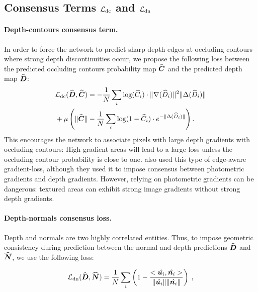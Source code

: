 \documentclass[10pt,twocolumn,letterpaper]{article}
\begin{document}
\subsection{Consensus Terms $\mathcal{L}_{\text{dc}}$ and 
$\mathcal{L}_{\text{dn}}$}\label{ssec:consensus_terms}

\paragraph{Depth-contours consensus term.}
In order to force the network to predict  sharp depth edges at  occluding 
contours where strong depth  discontinuities occur, we  propose the following 
loss  between the predicted occluding contours probability map  $\widehat{\boldsymbol{C}}$ and the 
predicted depth map $\widehat{\boldsymbol{D}}$:
\begin{equation}
\begin{aligned}
  &\mathcal{L}_{\text{dc}}(\widehat{\boldsymbol{D}}, \widehat{\boldsymbol{C}}) = -\frac{1}{N} \sum_i 
  \log(\widehat{C}_i)\cdot\|\nabla(\widehat{D}_i)\|^2\|\Delta(\widehat{D}_i)\| \\
  &+\mu \left( \|\widehat{\boldsymbol{C}}\| - \frac{1}{N}\sum_i  \log(1-\widehat{C}_i)\cdot   
  e^{-\|\Delta(\widehat{D}_i)\|}\right).
\end{aligned}
 \label{eq:depth_edge_consensus}
\end{equation}
This encourages the network to associate  pixels with large depth gradients with
occluding contours:  High-gradient areas will  lead to  a large loss  unless the
occluding contour probability is close to one.
\cite{monodepth17,Heise2013PMHuber}   also   used   this  type   of   edge-aware
gradient-loss, although  they used  it to  impose consensus  between photometric
gradients and depth gradients. However, relying on 
photometric gradients can be dangerous: textured areas can exhibit strong image 
gradients without strong depth gradients.

\paragraph{Depth-normals consensus loss.}
\label{par:surface_consensus}

Depth and normals are two highly correlated entities. Thus, to impose 
geometric  consistency during prediction between the  normal and depth
predictions $\widehat{\boldsymbol{D}}$ and $\widehat{\boldsymbol{N}}$, we use the following loss:

\begin{equation}
\mathcal{L}_{\text{dn}}(\widehat{\boldsymbol{D}}, \widehat{\boldsymbol{N}}) = \frac{1}{N} \sum_i\left(1 -
\dfrac{<\hat{\boldsymbol{u}_i}, \hat{\boldsymbol{n}_i}>}{\|\hat{\boldsymbol{u}_i}\|\|\hat{\boldsymbol{n}_i}\|}\right) \> ,
\label{eq:normals_depth_consensus}
\end{equation}
\end{document}
